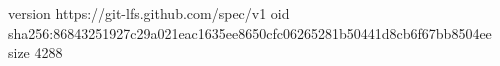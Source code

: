 version https://git-lfs.github.com/spec/v1
oid sha256:86843251927c29a021eac1635ee8650cfc06265281b50441d8cb6f67bb8504ee
size 4288
